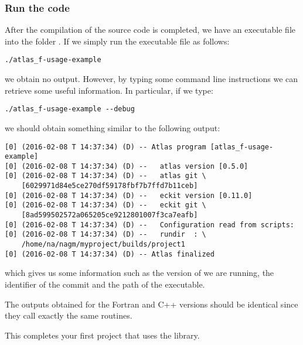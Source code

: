 \subsubsection*{Run the code}
After the compilation of the source code is completed, 
we have an executable file into the folder .
If we simply run the executable file as follows:
%
\begin{lstlisting}[style=BashStyle]
./atlas_f-usage-example
\end{lstlisting}
% 
we obtain no output. However, by typing some command 
line instructions we can retrieve some useful information. 
In particular, if we type:
%
\begin{lstlisting}[style=BashStyle]
./atlas_f-usage-example --debug
\end{lstlisting}
%
we should obtain something similar to the following output:
%
\begin{lstlisting}[style=BashStyle]
[0] (2016-02-08 T 14:37:34) (D) -- Atlas program [atlas_f-usage-example]
[0] (2016-02-08 T 14:37:34) (D) --   atlas version [0.5.0]
[0] (2016-02-08 T 14:37:34) (D) --   atlas git \
    [6029971d84e5ce270df59178fbf7b7ffd7b11ceb]
[0] (2016-02-08 T 14:37:34) (D) --   eckit version [0.11.0]
[0] (2016-02-08 T 14:37:34) (D) --   eckit git \
    [8ad599502572a065205ce9212801007f3ca7eafb]
[0] (2016-02-08 T 14:37:34) (D) --   Configuration read from scripts:
[0] (2016-02-08 T 14:37:34) (D) --   rundir  : \ 
    /home/na/nagm/myproject/builds/project1
[0] (2016-02-08 T 14:37:34) (D) -- Atlas finalized
\end{lstlisting}
%
which gives us some information such as the version of \Atlas we are 
running, the identifier of the commit and the path of the executable. 

\begin{tipbox}
The outputs obtained for the Fortran and C++ versions should be identical
since they call exactly the same routines. 
\end{tipbox}

This completes your first project that uses the \Atlas library.






